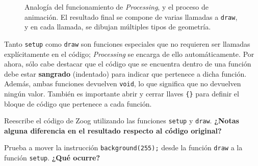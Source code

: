 \documentclass[
  spanish,
  11pt,
  a4paper,
  DIV=11,
  numbers=noendperiod]{scrartcl}
\begin{document}
\begin{figure}

\caption{\label{fig-disney-animation}Analogía del funcionamiento de \emph{Processing}, y el proceso de animación. El resultado final se compone de varias llamadas a \texttt{draw}, y en cada llamada, se dibujan múltiples tipos de geometría.}

\end{figure}%


Tanto \texttt{setup} como \texttt{draw} son funciones especiales que no requieren ser llamadas explícitamente en el código; \emph{Processing} se encarga de ello automáticamente. Por ahora, sólo cabe destacar que el código que se encuentra dentro de una función debe estar \textbf{sangrado} (indentado) para indicar que pertenece a dicha función. Además, ambas funciones devuelven \texttt{void}, lo que significa que no devuelven ningún valor. También es importante abrir y cerrar llaves \texttt{\{\}} para definir el bloque de código que pertenece a cada función.

\begin{tcolorbox}[enhanced jigsaw, toprule=.15mm, coltitle=black, titlerule=0mm, opacitybacktitle=0.6, breakable, colback=white, colframe=quarto-callout-note-color-frame, colbacktitle=quarto-callout-note-color!10!white, opacityback=0, title={Ejercicio 11 - Zoog, utilizando \texttt{setup} y \texttt{draw}}, bottomtitle=1mm, rightrule=.15mm, toptitle=1mm, left=2mm, bottomrule=.15mm, leftrule=.75mm, arc=.35mm]

Reescribe el código de Zoog utilizando las funciones \texttt{setup} y \texttt{draw}. \textbf{¿Notas alguna diferencia en el resultado respecto al código original?}


\end{tcolorbox}

\begin{tcolorbox}[enhanced jigsaw, toprule=.15mm, coltitle=black, titlerule=0mm, opacitybacktitle=0.6, breakable, colback=white, colframe=quarto-callout-warning-color-frame, colbacktitle=quarto-callout-warning-color!10!white, opacityback=0, title={Color de fondo}, bottomtitle=1mm, rightrule=.15mm, toptitle=1mm, left=2mm, bottomrule=.15mm, leftrule=.75mm, arc=.35mm]

Prueba a mover la instrucción \texttt{background(255);} desde la función \texttt{draw} a la función \texttt{setup}. \textbf{¿Qué ocurre?}

\end{tcolorbox}
\end{document}
